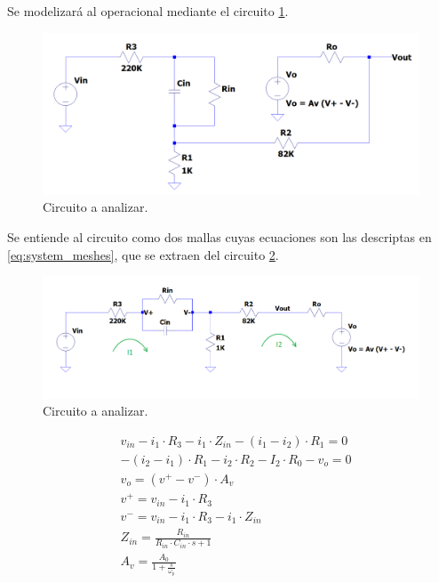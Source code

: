 Se modelizará al operacional mediante el circuito \ref{fig:non_ideal_circuit}.
\begin{figure}[H]
    \begin{minipage}{\textwidth}
        \centering
        \includegraphics[width=\textwidth]{../EJ2/recursos_para_el_informe/circuito_a_analizar_no_ideal}
        \caption{Circuito a analizar.}
        \label{fig:non_ideal_circuit}
    \end{minipage}\hfill
\end{figure}

Se entiende al circuito como dos mallas cuyas ecuaciones son las descriptas en \ref{eq:system_meshes}, que se extraen del circuito \ref{fig:meshes_circuit}.
\begin{figure}[H]
    \begin{minipage}{\textwidth}
        \centering
        \includegraphics[width=\textwidth]{../EJ2/recursos_para_el_informe/circuito_mallas}
        \caption{Circuito a analizar.}
        \label{fig:meshes_circuit}
    \end{minipage}\hfill
\end{figure}

\begin{align}
    \label{eq:system_meshes}
    &v_{in} - i_1 \cdot R_3 - i_1 \cdot Z_{in} - \left(i_1 - i_2\right) \cdot R_1 = 0 \\
    &-\left(i_2 - i_1\right) \cdot R_1 - i_2 \cdot R_2 - I_2 \cdot R_0 - v_o = 0 \\
    &v_o = \left(v^+ - v^-\right) \cdot A_v \\
    &v^+ = v_{in} - i_1 \cdot R_3 \\
    &v^- = v_{in} - i_1 \cdot R_3 - i_1 \cdot Z_{in} \\
    &Z_{in} = \frac{R_{in}}{R_{in} \cdot C_{in} \cdot s + 1} \label{eq:zin} \\
    &A_v = \frac{A_0}{1+\frac{s}{\omega_p}}
\end{align}

